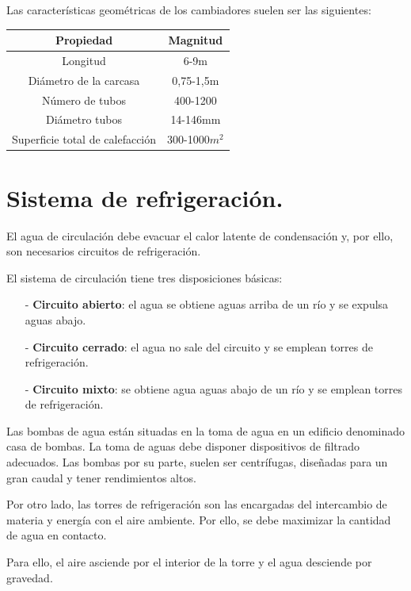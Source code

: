 Las características geométricas de los cambiadores suelen ser las siguientes:
\begin{table}[H]
	\centering
	\renewcommand{\arraystretch}{1.5}
	\begin{tabular}{cc}
		\hline
		Propiedad&Magnitud\\
		\hline
		Longitud&6-9m\\
		\hline
		Diámetro de la carcasa&0,75-1,5m\\
		\hline
		Número de tubos&400-1200\\
		\hline
		Diámetro tubos&14-146mm\\
		\hline
		Superficie total de calefacción&300-1000$m^2$\\
		\hline
		
	\end{tabular}
\end{table}

\section{Sistema de refrigeración.}
El agua de circulación debe evacuar el calor latente de condensación y, por ello, son necesarios circuitos de refrigeración.


El sistema de circulación tiene tres disposiciones básicas:
\begin{itemize}
	\item [-] \textbf{Circuito abierto}: el agua se  obtiene aguas arriba de un río y se expulsa aguas abajo.
	\item [-] \textbf{Circuito cerrado}: el agua no sale del circuito y se emplean torres de refrigeración.
	\item [-] \textbf{Circuito mixto}: se obtiene agua aguas abajo de un río y se emplean torres de refrigeración.
\end{itemize}
	
Las bombas de agua están situadas en la toma de agua en un edificio denominado casa de bombas. La toma de aguas debe disponer dispositivos de filtrado adecuados. Las bombas por su parte, suelen ser centrífugas, diseñadas para un gran caudal y tener rendimientos altos.


Por otro lado, las torres de refrigeración son las encargadas del intercambio de materia y energía con el aire ambiente. Por ello, se debe maximizar la cantidad de agua en contacto.


Para ello, el aire asciende por el interior de la torre y el agua desciende por gravedad.



